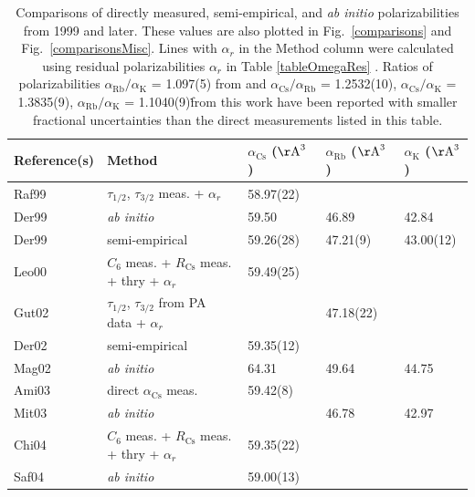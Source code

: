 \documentclass[twocolumn,pra,showpacs,superscriptaddress,longbibliography]{revtex4-1}   %
\newcommand{\figref}[1]{Fig.~\ref{#1}}
\newcommand{\ak}{\alpha_{\textrm{K}}}
\newcommand{\arb}{\alpha_{\textrm{Rb}}}
\newcommand{\acs}{\alpha_{\textrm{Cs}}}
\newcommand{\ratRbK}{1.1040(9)}
\newcommand{\ratCsK}{1.3835(9)}
\newcommand{\ratCsRb}{1.2532(10)}
\newcommand{\rcs}{R_{\mathrm{Cs}}}
\newcommand{\AAA}{\mathrm{\AA}}
\newcommand{\abinit}{\textit{ab initio} }
\begin{document}
\begingroup
\begin{table}
\caption{\label{tableComparisons} Comparisons of directly measured, semi-empirical, and \abinit polarizabilities from 1999 and later. These values are also plotted in \figref{comparisons} and \figref{comparisonsMisc}.  Lines with $\alpha_r$ in the Method column were calculated using residual polarizabilities $\alpha_r$ in Table \ref{tableOmegaRes} \cite{Derevianko2001,Safronova2006}.  Ratios of polarizabilities $\arb/\ak$ = 1.097(5) from \cite{Holmgren2010} and $\acs/\arb$ = \ratCsRb, $\acs/\ak$ = \ratCsK, $\arb/\ak$ = \ratRbK \. from this work have been reported with smaller fractional uncertainties than the direct measurements listed in this table.}
\begin{center}
\begin{tabular}{l l l l l}
\hline\hline
Reference(s) & Method & $\acs$ ($\AAA^3$) \,\,\,\,& $\arb$ ($\AAA^3$) \,\,\,\,& $\ak$ ($\AAA^3$) \\
\hline
Raf99 \cite{Rafac1999,Derevianko2001}  & $\tau_{1/2}$, $\tau_{3/2}$ meas. + $\alpha_r$& 58.97(22) &  &  \\
Der99 \cite{Derevianko1998} & \abinit & 59.50 & 46.89 & 42.84 \\
Der99 \cite{Derevianko1998} & semi-empirical & 59.26(28) & 47.21(9) & 43.00(12) \\
Leo00 \cite{Leo2000,Rafac1998,Derevianko2001}  & $C_6$ meas. + $\rcs$ meas. + thry + $\alpha_r$ \,\,& 59.49(25) & & \\
Gut02 \cite{Gutterres2002,Gabbanini2000,Safronova2006} \,\, & $\tau_{1/2}$, $\tau_{3/2}$ from PA data + $\alpha_r$ & & 47.18(22) & \\
Der02 \cite{Derevianko2001} & semi-empirical & 59.35(12) & & \\
Mag02 \cite{Magnier2002} & \abinit & 64.31 & 49.64 & 44.75 \\
Ami03 \cite{Amini2003} & direct $\acs$ meas. & 59.42(8) & & \\
Mit03 \cite{Mitroy2003} & \abinit & & 46.78 & 42.97 \\
Chi04 \cite{Chin2004,Rafac1998,Derevianko2001} & $C_6$ meas. + $\rcs$ meas. + thry + $\alpha_r$ & 59.35(22) & & \\
Saf04 \cite{Safronova2004} & \abinit & 59.00(13) & & \\

\end{tabular}
\end{center}
\end{table}
\end{document}
